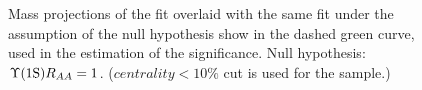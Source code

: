 \begin{figure}
\begin{center}
\caption{Mass projections of the fit overlaid with the same fit under the assumption of the null hypothesis show in the dashed green curve, used in the estimation of the significance. Null hypothesis: $\Upsilon\text{(1S)} R_{AA} = 1$. ($centrality < 10\% $ cut is used for the \PbPb sample.) }
\label{fig:raa_Y1s0-10Signif}
\end{center}
\end{figure}
